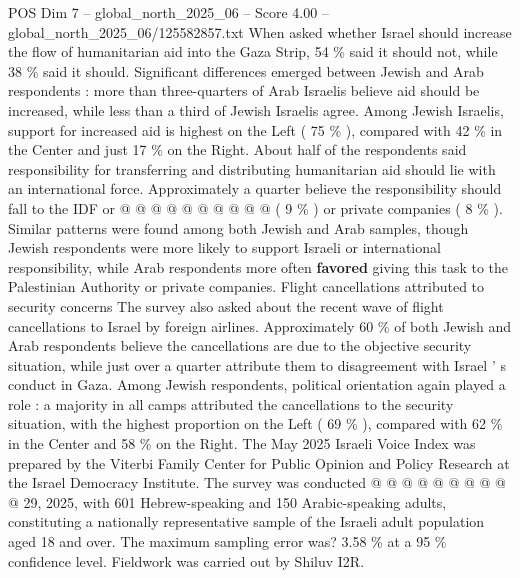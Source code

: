 \begin{textsample}{POS Dim 7 – global\_north\_2025\_06 – Score 4.00 – global\_north\_2025\_06/125582857.txt}
When asked whether Israel should increase the flow of humanitarian aid into the Gaza Strip, 54 \% said it should not, while 38 \% said it should.
Significant differences emerged between Jewish and Arab respondents : more than three-quarters of Arab Israelis believe aid should be increased, while less than a third of Jewish Israelis agree.
Among Jewish Israelis, support for increased aid is highest on the Left ( 75 \% ), compared with 42 \% in the Center and just 17 \% on the Right.
About half of the respondents said responsibility for transferring and distributing humanitarian aid should lie with an international force.
Approximately a quarter believe the responsibility should fall to the IDF or @ @ @ @ @ @ @ @ @ @ ( 9 \% ) or private companies ( 8 \% ).
Similar patterns were found among both Jewish and Arab samples, though Jewish respondents were more likely to support Israeli or international responsibility, while Arab respondents more often \textbf{favored} giving this task to the Palestinian Authority or private companies.
Flight cancellations attributed to security concerns The survey also asked about the recent wave of flight cancellations to Israel by foreign airlines.
Approximately 60 \% of both Jewish and Arab respondents believe the cancellations are due to the objective security situation, while just over a quarter attribute them to disagreement with Israel ' s conduct in Gaza.
Among Jewish respondents, political orientation again played a role : a majority in all camps attributed the cancellations to the security situation, with the highest proportion on the Left ( 69 \% ), compared with 62 \% in the Center and 58 \% on the Right.
The May 2025 Israeli Voice Index was prepared by the Viterbi Family Center for Public Opinion and Policy Research at the Israel Democracy Institute.
The survey was conducted @ @ @ @ @ @ @ @ @ @ 29, 2025, with 601 Hebrew-speaking and 150 Arabic-speaking adults, constituting a nationally representative sample of the Israeli adult population aged 18 and over.
The maximum sampling error was? 3.58 \% at a 95 \% confidence level.
Fieldwork was carried out by Shiluv I2R.

\end{textsample}
